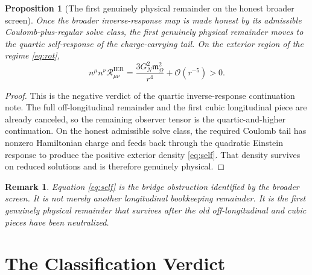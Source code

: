 \documentclass[11pt]{article}
\newcommand{\RemIER}{\mathcal R_{\mu\nu}^{\mathrm{IER}}}
\newcommand{\HamChargeOmega}{\mathfrak m_{\Omega}}
\newtheorem{proposition}{Proposition}
\newtheorem{remark}{Remark}
\begin{document}
\begin{proposition}[The first genuinely physical remainder on the honest broader screen]
\label{prop:self}
Once the broader inverse-response map is made honest by its admissible Coulomb-plus-regular solve class, the first genuinely physical remainder moves to the quartic self-response of the charge-carrying tail. On the exterior region of the regime \eqref{eq:rot},
\begin{equation}
n^\mu n^\nu \RemIER
=
\frac{3G_N^2\HamChargeOmega^2}{r^4}
+ \mathcal O(r^{-5})
>0.
\label{eq:self}
\end{equation}
\end{proposition}

\begin{proof}
This is the negative verdict of the quartic inverse-response continuation note. The full off-longitudinal remainder and the first cubic longitudinal piece are already canceled, so the remaining observer tensor is the quartic-and-higher continuation. On the honest admissible solve class, the required Coulomb tail has nonzero Hamiltonian charge and feeds back through the quadratic Einstein response to produce the positive exterior density \eqref{eq:self}. That density survives on reduced solutions and is therefore genuinely physical.
\end{proof}

\begin{remark}
Equation \eqref{eq:self} is the bridge obstruction identified by the broader screen. It is not merely another longitudinal bookkeeping remainder. It is the first genuinely physical remainder that survives after the old off-longitudinal and cubic pieces have been neutralized.
\end{remark}

\section{The Classification Verdict}
\end{document}
